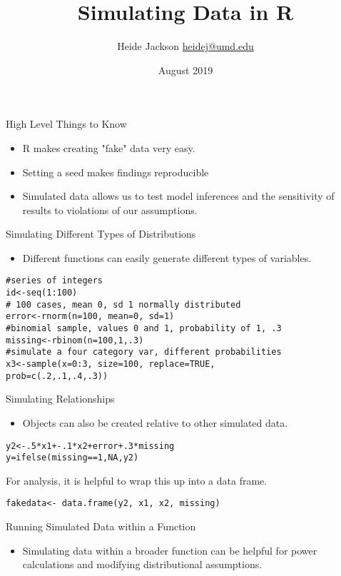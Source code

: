 \documentclass{beamer}
\title{Simulating Data in R}
\author{\texorpdfstring{Heide Jackson \newline\url{heidej@umd.edu}}{Author}}
\institute{University of Maryland Population Research Center}
\date{August 2019}
\begin{document}
\maketitle
\begin{frame}{High Level Things to Know}
\begin{itemize}
\item R makes creating "fake" data very easy.
\item Setting a seed makes findings reproducible
\item Simulated data allows us to test model inferences and the sensitivity of results to violations of our assumptions. 
\end{itemize}
\end{frame}


\begin{frame}[fragile]{Simulating Different Types of Distributions}
\begin{itemize}
    \item Different functions can easily generate different types of variables.
\end{itemize}
\begin{verbatim}
#series of integers
id<-seq(1:100) 
# 100 cases, mean 0, sd 1 normally distributed
error<-rnorm(n=100, mean=0, sd=1) 
#binomial sample, values 0 and 1, probability of 1, .3
missing<-rbinom(n=100,1,.3)
#simulate a four category var, different probabilities
x3<-sample(x=0:3, size=100, replace=TRUE, 
prob=c(.2,.1,.4,.3))
\end{verbatim}
\end{frame}


\begin{frame}[fragile]{Simulating Relationships}
\begin{itemize}
    \item Objects can also be created relative to other simulated data.
\end{itemize}
\begin{verbatim}
y2<-.5*x1+-.1*x2+error+.3*missing
y=ifelse(missing==1,NA,y2)
\end{verbatim}
\item For analysis, it is helpful to wrap this up into a data frame.
\begin{verbatim}
fakedata<- data.frame(y2, x1, x2, missing)
\end{verbatim}
\end{frame}

\begin{frame}{Running Simulated Data within a Function}
\begin{itemize}
    \item Simulating data within a broader function can be helpful for power calculations and modifying distributional assumptions.
\end{itemize}
\end{frame}
\end{document}
